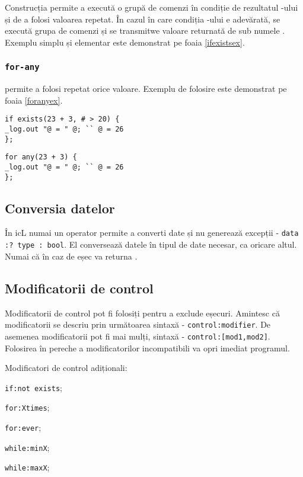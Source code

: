 Construcția  permite a execută o grupă de comenzi în condiție de rezultatul -ului și de a folosi valoarea repetat. În cazul în care condiția -ului e adevărată, se execută grupa de comenzi și se transmitwe valoare returnată de  sub numele .
Exemplu simplu și elementar este demonstrat pe foaia \ref{ifexistsex}.

\subsubsection{\lstinline|for-any|}

 permite a folosi repetat orice valoare. Exemplu de folosire este demonstrat pe foaia \ref{foranyex}.

\begin{lstlisting}[caption=Folosirea if-exist-ului, label=ifexistsex]
if exists(23 + 3, # > 20) {
_log.out "@ = " @; `` @ = 26
};
\end{lstlisting}

\begin{lstlisting}[caption=Folosirea for-any-ului, label=foranyex]
for any(23 + 3) {
_log.out "@ = " @; `` @ = 26
};
\end{lstlisting}


\subsection{Conversia datelor}

În icL numai un operator permite a converti date și nu generează excepții - \lstinline|data :? type : bool|.
El conversează datele în tipul de date necesar, ca oricare altul. Numai că în caz de eșec va returna \void.

\subsection{Modificatorii de control}

Modificatorii de control pot fi folosiți pentru a exclude eșecuri.
Amintesc că modificatorii se descriu prin următoarea sintaxă - \lstinline|control:modifier|. De asemenea modificatorii pot fi mai mulți, sintaxă - \lstinline|control:[mod1,mod2]|. Folosirea în pereche a modificatorilor incompatibili va opri imediat programul.

Modificatori de control adiționali:
\begin{icItems}
	\item \lstinline|if:not exists|;
	\item \lstinline|for:Xtimes|;
	\item \lstinline|for:ever|;
	\item \lstinline|while:minX|;
	\item \lstinline|while:maxX|;
\end{icItems}

